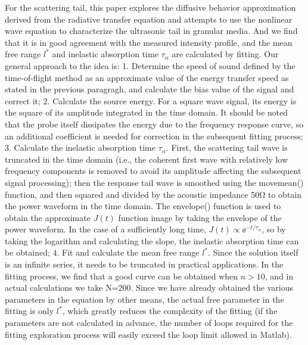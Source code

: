 \begin{digest}
    For the scattering tail, this paper explores the diffusive behavior approximation derived from the radiative transfer equation and attempts to use the nonlinear wave equation to characterize the ultrasonic tail in granular media. And we find that it is in good agreement with the measured intensity profile, and the mean free range $l^{*}$ and inelastic absorption time $\tau_{\alpha}$ are calculated by fitting.
    Our general approach to the idea is:
    1. Determine the speed of sound defined by the time-of-flight method as an approximate value of the energy transfer speed as stated in the previous paragragh, and calculate the bias value of the signal and correct it;
    2. Calculate the source energy. For a square wave signal, its energy is the square of its amplitude integrated in the time domain. It should be noted that the probe itself dissipates the energy due to the frequency response curve, so an additional coefficient is needed for correction in the subsequent fitting process;
    3. Calculate the inelastic absorption time $\tau_{\alpha}$. First, the scattering tail wave is truncated in the time domain (i.e., the coherent first wave with relatively low frequency components is removed to avoid its amplitude affecting the subsequent signal processing); then the response tail wave is smoothed using the movemean() function, and then squared and divided by the acoustic impedance 50\unit{\ohm} to obtain the power waveform in the time domain. The envelope() function is used to obtain the approximate $J(t)$ function image by taking the envelope of the power waveform. In the case of a sufficiently long time, $J(t)\propto {\ee}^{-t/\tau_{\alpha}}$, so by taking the logarithm and calculating the slope, the inelastic absorption time can be obtained;
    4. Fit and calculate the mean free range $l^{*}$. Since the solution itself is an infinite series, it needs to be truncated in practical applications. In the fitting process, we find that a good curve can be obtained when $n>10$, and in actual calculations we take N=200. Since we have already obtained the various parameters in the equation by other means, the actual free parameter in the fitting is only $l^{*}$, which greatly reduces the complexity of the fitting (if the parameters are not calculated in advance, the number of loops required for the fitting exploration process will easily exceed the loop limit allowed in Matlab).


\end{digest}
